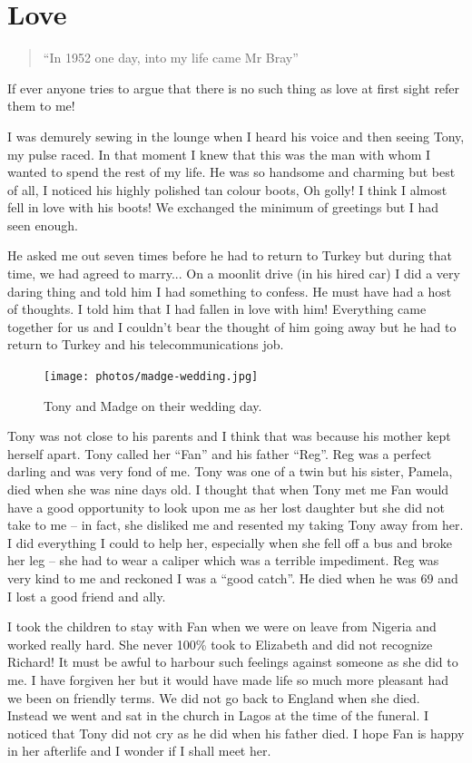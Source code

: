 \chapter{Love}

\begin{verse}
``In 1952 one day, into my life came Mr Bray''
\end{verse}

If ever anyone tries to argue that there is no such thing as love at
first sight refer them to me!

I was demurely sewing in the lounge when I heard his voice and then
seeing Tony, my pulse raced. In that moment I knew that this was the
man with whom I wanted to spend the rest of my life. He was so
handsome and charming but best of all, I noticed his highly polished
tan colour boots, Oh golly! I think I almost fell in love with his
boots! We exchanged the minimum of greetings but I had seen enough.

He asked me out seven times before he had to return to Turkey but
during that time, we had agreed to marry... On a moonlit drive (in his
hired car) I did a very daring thing and told him I had something to
confess. He must have had a host of thoughts. I told him that I had
fallen in love with him! Everything came together for us and I
couldn't bear the thought of him going away but he had to return to
Turkey and his telecommunications job.

\begin{figure}
  \centering
  \texttt{[image: photos/madge-wedding.jpg]}
  \caption{Tony and Madge on their wedding day.}
  \label{madge-wedding}
\end{figure}

Tony was not close to his parents and I think that was because his
mother kept herself apart. Tony called her ``Fan'' and his father
``Reg''. Reg was a perfect darling and was very fond of me. Tony was
one of a twin but his sister, Pamela, died when she was nine days
old. I thought that when Tony met me Fan would have a good opportunity
to look upon me as her lost daughter but she did not take to me -- in
fact, she disliked me and resented my taking Tony away from her. I did
everything I could to help her, especially when she fell off a bus and
broke her leg -- she had to wear a caliper which was a terrible
impediment. Reg was very kind to me and reckoned I was a ``good
catch''. He died when he was 69 and I lost a good friend and ally.

I took the children to stay with Fan when we were on leave from
Nigeria and worked really hard. She never 100\% took to Elizabeth and
did not recognize Richard! It must be awful to harbour such feelings
against someone as she did to me. I have forgiven her but it would
have made life so much more pleasant had we been on friendly terms. We
did not go back to England when she died. Instead we went and sat in
the church in Lagos at the time of the funeral. I noticed that Tony
did not cry as he did when his father died. I hope Fan is happy in her
afterlife and I wonder if I shall meet her.

